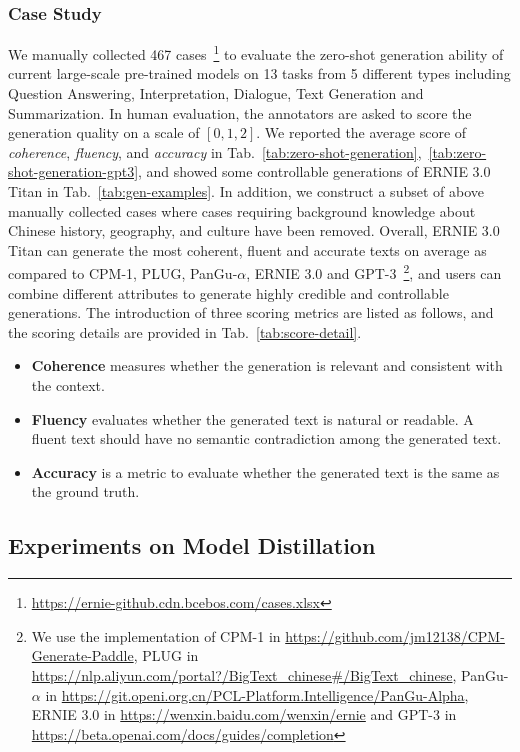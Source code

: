 \subsubsection{Case Study}\label{sec: zero-shot-case-study}

We manually collected 467 cases~\footnote{\url{https://ernie-github.cdn.bcebos.com/cases.xlsx}} to evaluate the zero-shot generation ability of current large-scale pre-trained models on 13 tasks from 5 different types including Question Answering, Interpretation, Dialogue, Text Generation and Summarization. In human evaluation, the annotators are asked to score the generation quality on a scale of $[0, 1, 2]$. We reported the average score of \textit{coherence}, \textit{fluency}, and \textit{accuracy} in Tab.~\ref{tab:zero-shot-generation},~\ref{tab:zero-shot-generation-gpt3}, and showed some controllable generations of ERNIE 3.0 Titan in Tab.~\ref{tab:gen-examples}. In addition, we construct a subset of above manually collected cases where cases requiring background knowledge about Chinese history, geography, and culture have been removed. Overall, ERNIE 3.0 Titan can generate the most coherent, fluent and accurate texts on average as compared to CPM-1, PLUG, PanGu-$\alpha$, ERNIE 3.0 and GPT-3~\footnote{We use the implementation of CPM-1 in \url{https://github.com/jm12138/CPM-Generate-Paddle}, PLUG in \url{https://nlp.aliyun.com/portal?/BigText_chinese\#/BigText_chinese}, PanGu-$\alpha$ in \url{https://git.openi.org.cn/PCL-Platform.Intelligence/PanGu-Alpha}, ERNIE 3.0 in \url{https://wenxin.baidu.com/wenxin/ernie} and GPT-3 in \url{https://beta.openai.com/docs/guides/completion}}, and users can combine different attributes to generate highly credible and controllable generations. The introduction of three scoring metrics are listed as follows, and the scoring details are provided in Tab.~\ref{tab:score-detail}.

\begin{itemize}
    \item \textbf{Coherence} measures whether the generation is relevant and consistent with the context.
    \item \textbf{Fluency} evaluates whether the generated text is natural or readable. A fluent text should have no semantic contradiction among the generated text.
    \item \textbf{Accuracy} is a metric to evaluate whether the generated text is the same as the ground truth.
\end{itemize}

\subsection{Experiments on Model Distillation}

